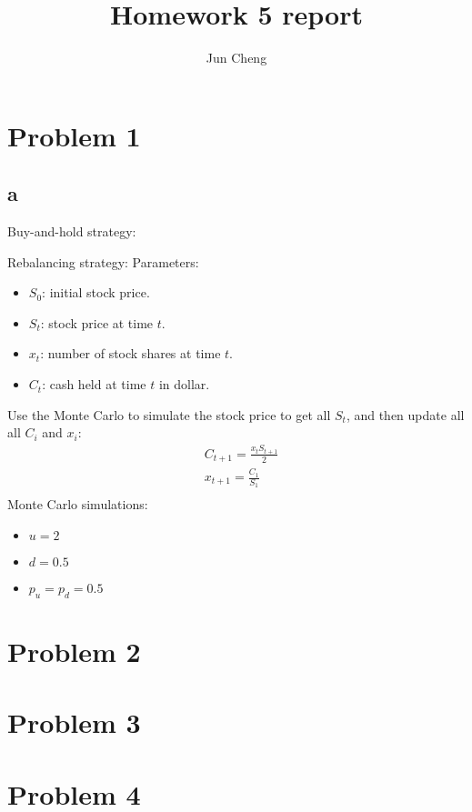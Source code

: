 \documentclass{report}
\begin{document}
\title{Homework 5 report}
\author{Jun Cheng}
\maketitle

\section*{Problem 1} 
\subsection*{a} 
Buy-and-hold strategy: 

Rebalancing strategy: 
Parameters: 
\begin{itemize}
\item $S_0$: initial stock price.
\item $S_t$: stock price at time $t$.
\item $x_t$: number of stock shares at time $t$.
\item $C_t$: cash held at time $t$ in dollar. 
\end{itemize}
Use the Monte Carlo to simulate the stock price to get all $S_t$,  and then update all all $C_i $ and $x_i$: 
\begin{align*}
&C_{t+1}=\frac{x_tS_{t+1}}{2} \\
&x_{t+1}=\frac{C_1}{S_1}\\
\end{align*}
Monte Carlo simulations: 
\begin{itemize}
\item $ u=2$
\item $ d=0.5$
\item $p_u = p_d = 0.5$
\end{itemize} 
\section*{Problem 2}

\section*{Problem 3}

\section*{Problem 4} 
\end{document}
